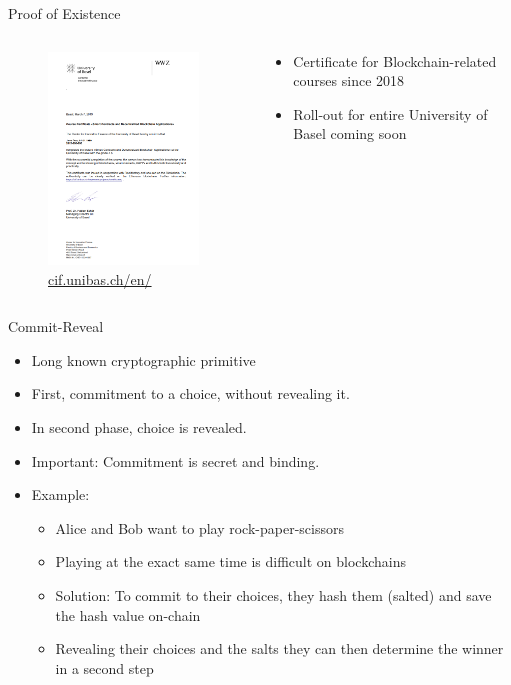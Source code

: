 \documentclass[]{beamer}
\begin{document}

\begin{frame}{Proof of Existence}
	\begin{columns}
		\begin{column}{0.4\textwidth}
			\begin{figure}
				\centering
				\includegraphics[width=4cm, frame]{../assets/images/Diploma_unibas.PNG}
				\scriptsize{\href{https://cif.unibas.ch/en/events-projects/certificates/}{cif.unibas.ch/en/}}
			\end{figure}
		\end{column}
		\begin{column}{0.6\textwidth}
			\begin{itemize}
				\item<1 -> Certificate for Blockchain-related courses since 2018 
				\item<2 -> Roll-out for entire University of Basel coming soon
			\end{itemize}
		\end{column}
	\end{columns}
\end{frame}


\begin{frame}{Commit-Reveal}
	\begin{itemize}
		\item<1 -> Long known cryptographic primitive
		\item<2 -> First, commitment to a choice, without revealing it.
		\item<3 -> In second phase, choice is revealed.
		\item<4 -> Important: Commitment is secret and binding.\vspace{0.5cm}
		\item<5 -> Example:
		\begin{itemize}
			\item<5 -> Alice and Bob want to play rock-paper-scissors
			\item<6 -> Playing at the exact same time is difficult on blockchains
			\item<7 -> Solution: To commit to their choices, they hash them (salted) and save the hash value on-chain
			\item<8 -> Revealing their choices and the salts they can then determine the winner in a second step
		\end{itemize}
	\end{itemize}
\end{frame}
\end{document}

